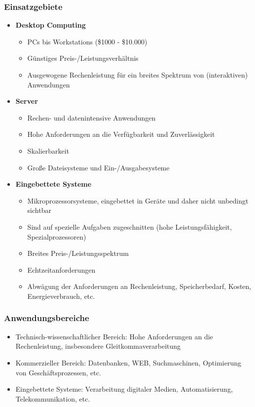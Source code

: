 \subsubsection{Einsatzgebiete}
\begin{itemize}
	\item \textbf{Desktop Computing}
	\begin{itemize}
		\item PCs bis Workstations (\$1000 - \$10.000)
		\item Günstiges Preis-/Leistungsverhältnis
		\item Ausgewogene Rechenleistung für ein breites Spektrum von (interaktiven) Anwendungen
	\end{itemize}
	\item \textbf{Server}
	\begin{itemize}
		\item Rechen- und datenintensive Anwendungen
		\item Hohe Anforderungen an die Verfügbarkeit und Zuverlässigkeit
		\item Skalierbarkeit
		\item Große Dateisysteme und Ein-/Ausgabesysteme
	\end{itemize}
	\item \textbf{Eingebettete Systeme}
	\begin{itemize}
		\item Mikroprozessorsysteme, eingebettet in Geräte und daher nicht unbedingt sichtbar
		\item Sind auf spezielle Aufgaben zugeschnitten (hohe Leistungsfähigkeit, Spezialprozessoren)
		\item Breites Preis-/Leistungsspektrum
		\item Echtzeitanforderungen
		\item Abwägung der Anforderungen an Rechenleistung, Speicherbedarf, Kosten, Energieverbrauch, etc.
	\end{itemize}
\end{itemize}

\subsubsection{Anwendungsbereiche}
\begin{itemize}
	\item Technisch-wissenschaftlicher Bereich: Hohe Anforderungen an die Rechenleistung, insbesondere Gleitkommaverarbeitung
	\item Kommerzieller Bereich: Datenbanken, WEB, Suchmaschinen, Optimierung von Geschäftsprozessen, etc.
	\item Eingebettete Systeme: Verarbeitung digitaler Medien, Automatisierung, Telekommunikation, etc.
\end{itemize}


